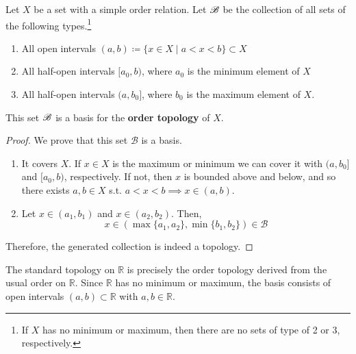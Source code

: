   \begin{definition}
    \label{def:order-topology}
    Let $X$ be a set with a simple order relation. Let $\operatorname{\mathscr{B}}$ be the collection of all sets of the following types.\footnote{If $X$ has no minimum or maximum, then there are no sets of type of 2 or 3, respectively.}
    \begin{enumerate}
      \item All open intervals $(a, b) \coloneqq \{x \in X \mid a < x < b\} \subset X$
      \item All half-open intervals $[a_0, b)$, where $a_0$ is the minimum element of $X$
      \item All half-open intervals $(a, b_0]$, where $b_0$ is the maximum element of $X$. 
    \end{enumerate}
    This set $\operatorname{\mathscr{B}}$ is a basis for the \textbf{order topology} of $X$. 
  \end{definition}
  \begin{proof}
    We prove that this set $\mathscr{B}$ is a basis. 
    \begin{enumerate}
      \item It covers $X$. If $x \in X$ is the maximum or minimum we can cover it with $(a, b_0]$ and $[a_0, b)$, respectively. If not, then $x$ is bounded above and below, and so there exists $a, b \in X$ s.t. $a < x < b \implies x \in (a, b)$. 

      \item Let $x \in (a_1, b_1)$ and $x \in (a_2, b_2)$. Then, 
      \begin{equation}
        x \in (\max\{a_1, a_2\}, \min\{b_1, b_2\}) \in \mathscr{B} 
      \end{equation}
    \end{enumerate}
    Therefore, the generated collection is indeed a topology. 
  \end{proof}

  \begin{example}
    \label{ex:standard-order-topology-on-r}
    The standard topology on $\mathbb{R}$ is precisely the order topology derived from the usual order on $\mathbb{R}$. Since $\mathbb{R}$ has no minimum or maximum, the basis consists of open intervals $(a, b) \subset \mathbb{R}$ with $a, b \in \mathbb{R}$. 
  \end{example}

